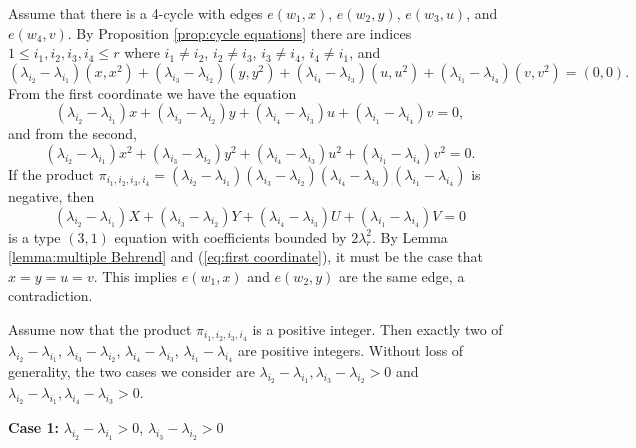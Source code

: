\documentclass[12pt]{article}%
\newcommand{\coeff}[2]{( \lambda_{i_#1} - \lambda_{i_#2} ) }
\newcommand{\coeffnp}[2]{ \lambda_{i_#1} - \lambda_{i_#2}  }
\begin{document}
\medskip {} Assume that there is a 4-cycle with edges $e(w_1 , x)$, $e(w_2,y)$, $e(w_3,u)$, and $e(w_4,v)$. 
%    
By Proposition \ref{prop:cycle equations} there are indices $1 \leq i_1,i_2,i_3,i_4 \leq r$ where $i_1 \neq i_2$, $i_2 \neq i_3$, $i_3 \neq i_4$, $i_4 \neq i_1$, and 
\[
( \lambda_{i_2} - \lambda_{i_1} ) (x,x^2)
+ 
(\lambda_{i_3} - \lambda_{i_2} ) (y,y^2)
+ 
(\lambda_{i_4} - \lambda_{i_3} ) (u,u^2) 
+ 
(\lambda_{i_1} - \lambda_{i_4} ) ( v,v^2) 
=(0,0).  
\]
From the first coordinate we have the equation 
  \begin{equation}\label{eq:first coordinate}
 \coeff{2}{1} x + \coeff{3}{2} y + \coeff{4}{3} u + \coeff{1}{4} v  = 0,
 \end{equation}
 and from the second,
 \begin{equation}\label{eq:second coordinate}
  \coeff{2}{1} x^2 + \coeff{3}{2} y^2 + \coeff{4}{3} u^2 + \coeff{1}{4} v^2  = 0.
 \end{equation}
If the product $\pi_{i_1,i_2,i_3,i_4} = 
 \coeff{2}{1} \coeff{3}{2} \coeff{4}{3} \coeff{1}{4}$ 
 is negative, then 
   \begin{equation*}
 \coeff{2}{1} X + \coeff{3}{2} Y + \coeff{4}{3} U + \coeff{1}{4} V  = 0
 \end{equation*}
 is a type $(3,1)$ equation with coefficients bounded 
 by $2 \lambda_r^2$.  By Lemma \ref{lemma:multiple Behrend} and (\ref{eq:first coordinate}), it must be the case that $x = y = u = v$.  This implies $e(w_1,x)$ and $e(w_2,y)$ are the same edge, a contradiction.

 Assume now that the product $\pi_{i_1,i_2,i_3,i_4}$ is a  positive integer.  Then exactly two of $\coeffnp{2}{1}$, $\coeffnp{3}{2}$, $\coeffnp{4}{3}$, $\coeffnp{1}{4}$ are positive integers.  Without loss of generality, the two cases we consider are  $\coeffnp{2}{1}, \coeffnp{3}{2} > 0$ and $\coeffnp{2}{1}, \coeffnp{4}{3} > 0$.
   
  \medskip
 \noindent
 \textbf{Case 1:} $\coeffnp{2}{1} > 0$, $\coeffnp{3}{2} > 0$
 
\end{document}
